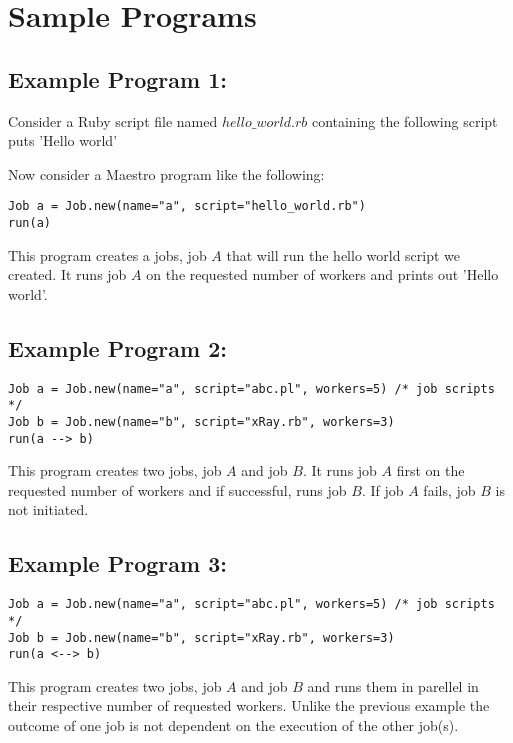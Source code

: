\section{Sample Programs}
\label{sect:samples}
\subsection*{Example Program 1:}
Consider a Ruby script file named $hello\_world.rb$ containing the following script
puts 'Hello world'

Now consider a Maestro program like the following:
\begin{lstlisting}
Job a = Job.new(name="a", script="hello_world.rb")
run(a)
\end{lstlisting}

This program creates a jobs, job $A$ that will run the hello world script we created. 
It runs job $A$ on the requested number of workers and prints out 'Hello world'.
\\

\subsection*{Example Program 2:}
\begin{lstlisting}
Job a = Job.new(name="a", script="abc.pl", workers=5) /* job scripts */
Job b = Job.new(name="b", script="xRay.rb", workers=3)
run(a --> b)
\end{lstlisting}

This program creates two jobs, job $A$ and job $B$. It runs job $A$ first on the requested number of workers
and if successful, runs job $B$. If job $A$ fails, job $B$ is not initiated.
\\

\subsection*{Example Program 3:}
\begin{lstlisting}
Job a = Job.new(name="a", script="abc.pl", workers=5) /* job scripts */
Job b = Job.new(name="b", script="xRay.rb", workers=3)
run(a <--> b)
\end{lstlisting}

This program creates two jobs, job $A$ and job $B$ and runs them in parellel in their respective number of requested workers.
Unlike the previous example the outcome of one job is not dependent on the execution of the other job(s).
\\

